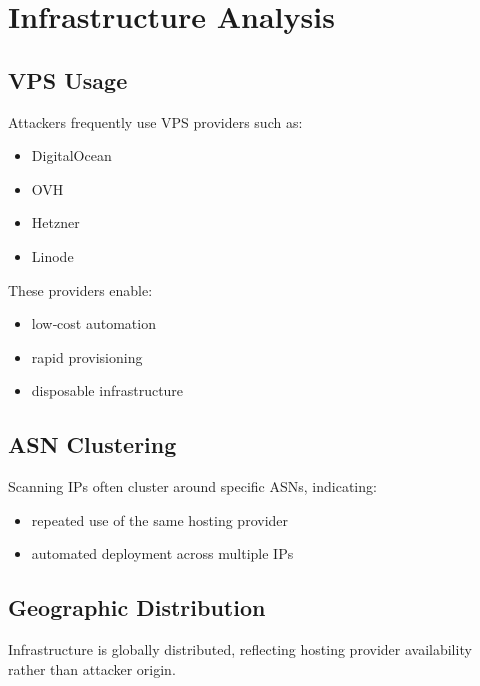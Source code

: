 \documentclass[12pt]{article}
\begin{document}
	\section{Infrastructure Analysis}
	
	\subsection*{VPS Usage}
	Attackers frequently use VPS providers such as:
	
	\begin{itemize}
		\item DigitalOcean  
		\item OVH  
		\item Hetzner  
		\item Linode  
	\end{itemize}
	
	These providers enable:
	
	\begin{itemize}
		\item low‑cost automation  
		\item rapid provisioning  
		\item disposable infrastructure  
	\end{itemize}
	
	\subsection*{ASN Clustering}
	Scanning IPs often cluster around specific ASNs, indicating:
	
	\begin{itemize}
		\item repeated use of the same hosting provider  
		\item automated deployment across multiple IPs  
	\end{itemize}
	
	\subsection*{Geographic Distribution}
	Infrastructure is globally distributed, reflecting hosting provider availability rather than attacker origin.
	
\end{document}
